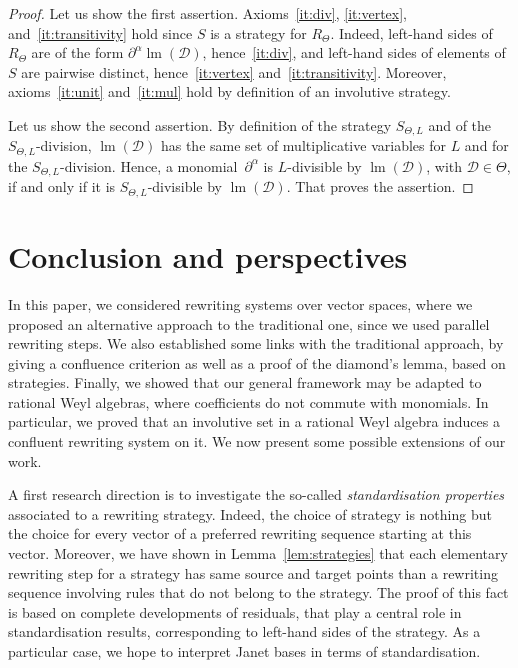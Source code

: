 \documentclass[11pt]{article}
\theoremstyle{definition}
\newcommand\D{\mathcal{D}}
\DeclareMathOperator{\lm}{lm}
\newcommand\RTheta{R_{\Theta}}
\newcommand\SThetaL{S_{\Theta,L}}
\begin{document}
\begin{proof}
  Let us show the first assertion. Axioms~\ref{it:div}, \ref{it:vertex},
  and~\ref{it:transitivity} hold since $S$ is a strategy for $\RTheta$.
  Indeed, left-hand sides of $\RTheta$ are of the form
  $\partial^\alpha\lm(\D)$, hence~\ref{it:div}, and left-hand sides of
  elements of $S$ are pairwise distinct, hence~\ref{it:vertex}
  and~\ref{it:transitivity}. Moreover, axioms~\ref{it:unit}
  and~\ref{it:mul} hold by definition of an involutive strategy.

  Let us show the second assertion. By definition of the strategy
  $\SThetaL$ and of the $\SThetaL$-division, $\lm(\D)$ has the same set
  of multiplicative variables for $L$ and for the $\SThetaL$-division.
  Hence, a monomial~$\partial^\alpha$ is $L$-divisible by $\lm(\D)$, with
  $\D\in\Theta$, if and only if it is $\SThetaL$-divisible by $\lm(\D)$.
  That proves the assertion.
\end{proof}

\section{Conclusion and perspectives}

In this paper, we considered rewriting systems over vector spaces, where
we proposed an alternative approach to the traditional one, since we used
parallel rewriting steps. We also established some links with the
traditional approach, by giving a confluence criterion as well as a proof
of the diamond's lemma, based on strategies. Finally, we showed that our
general framework may be adapted to rational Weyl algebras, where
coefficients do not commute with monomials. In particular, we proved that
an involutive set in a rational Weyl algebra induces a confluent
rewriting system on it. We now present some possible extensions of our
work.
\medskip

A first research direction is to investigate the so-called
{\em standardisation properties}~\cite{Mellies05jwklop} associated to a
rewriting strategy. Indeed, the choice of strategy is nothing but the
choice for every vector of a preferred rewriting sequence starting at 
this vector. Moreover, we have shown in Lemma~\ref{lem:strategies} that
each elementary rewriting step for a strategy has same source and target
points than a rewriting sequence involving rules that do not belong to
the strategy. The proof of this fact is based on complete developments of
residuals, that play a central role in standardisation results,
corresponding to left-hand sides of the strategy. As a particular case,
we hope to interpret Janet bases in terms of standardisation.
\medskip
\end{document}
